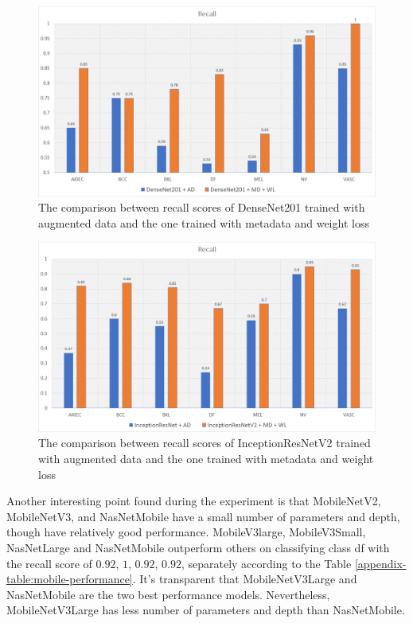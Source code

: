 \documentclass[sensors,article,submit,pdftex,moreauthors]{Definitions/mdpi}
\begin{document}
	\begin{figure}[H]
		\centering
		\includegraphics[width=1\linewidth]{Definitions/den re}
		\caption{The comparison between recall scores of DenseNet201 trained with augmented data and the one trained with metadata and weight loss}
		\label{fig:den recall}
	\end{figure}
	
	\begin{figure}[H]
		\centering
		\includegraphics[width=1\linewidth]{Definitions/in re}
		\caption{The comparison between recall scores of InceptionResNetV2 trained with augmented data and the one trained with metadata and weight loss}
		\label{fig:incep recall}
	\end{figure}
	
	Another interesting point found during the experiment is that MobileNetV2, MobileNetV3, and NasNetMobile have a small number of parameters and depth, though have relatively good performance. MobileV3large, MobileV3Small, NasNetLarge and NasNetMobile outperform others on classifying class df with the recall score of $0.92$, $1$, $0.92$, $0.92$, separately according to the Table \ref{appendix-table:mobile-performance}. It's transparent that MobileNetV3Large and NasNetMobile are the two best performance models. Nevertheless, MobileNetV3Large has less number of parameters and depth than NasNetMobile.
	
\end{document}
